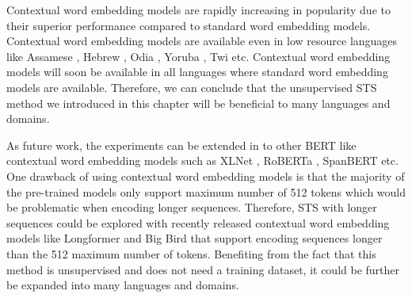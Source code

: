 Contextual word embedding models are rapidly increasing in popularity due to their superior performance compared to standard word embedding models. Contextual word embedding models are available even in low resource languages like Assamese \autocite{kakwani-etal-2020-indicnlpsuite}, Hebrew \autocite{chriqui2021hebert}, Odia \autocite{kakwani-etal-2020-indicnlpsuite}, Yoruba \autocite{alabi-etal-2020-massive}, Twi \autocite{alabi-etal-2020-massive} etc.  Contextual word embedding models will soon be available in all languages where standard word embedding models are available. Therefore, we can conclude that the unsupervised STS method we introduced in this chapter will be beneficial to many languages and domains. 

As future work, the experiments can be extended in to other BERT like contextual word embedding models such as XLNet \autocite{yang2019xlnet}, RoBERTa \autocite{liu2019roberta}, SpanBERT \autocite{joshi-etal-2020-spanbert} etc. One drawback of using contextual word embedding models is that the majority of the pre-trained models only support maximum number of 512 tokens which would be problematic when encoding longer sequences. Therefore, STS with longer sequences could be explored with recently released contextual word embedding models like Longformer \autocite{beltagy2020}  and Big Bird \autocite{zaheer2021} that support encoding sequences longer than the 512 maximum number of tokens. Benefiting from the fact that this method is unsupervised and does not need a training dataset, it could be further be expanded into many languages and domains.  

